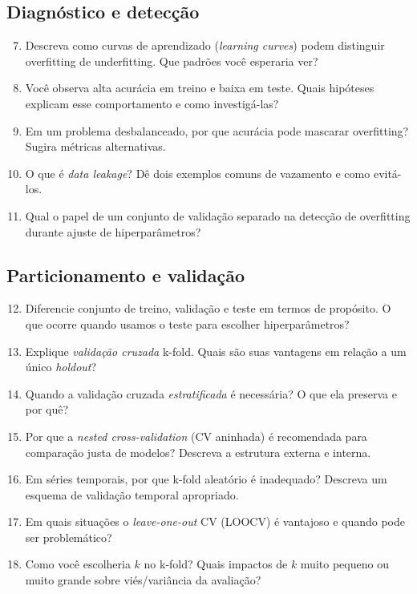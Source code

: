 \documentclass{article}
\begin{document}
\subsection{Diagnóstico e detecção}
\begin{enumerate}
  \setcounter{enumi}{6}
  \item Descreva como curvas de aprendizado (\textit{learning curves}) podem distinguir overfitting de underfitting. Que padrões você esperaria ver?
  \item Você observa alta acurácia em treino e baixa em teste. Quais hipóteses explicam esse comportamento e como investigá-las?
  \item Em um problema desbalanceado, por que acurácia pode mascarar overfitting? Sugira métricas alternativas.
  \item O que é \textit{data leakage}? Dê dois exemplos comuns de vazamento e como evitá-los.
  \item Qual o papel de um conjunto de validação separado na detecção de overfitting durante ajuste de hiperparâmetros?
\end{enumerate}

\subsection{Particionamento e validação}
\begin{enumerate}
  \setcounter{enumi}{11}
  \item Diferencie conjunto de treino, validação e teste em termos de propósito. O que ocorre quando usamos o teste para escolher hiperparâmetros?
  \item Explique \textit{validação cruzada} k-fold. Quais são suas vantagens em relação a um único \textit{holdout}?
  \item Quando a validação cruzada \textit{estratificada} é necessária? O que ela preserva e por quê?
  \item Por que a \textit{nested cross-validation} (CV aninhada) é recomendada para comparação justa de modelos? Descreva a estrutura externa e interna.
  \item Em séries temporais, por que k-fold aleatório é inadequado? Descreva um esquema de validação temporal apropriado.
  \item Em quais situações o \textit{leave-one-out} CV (LOOCV) é vantajoso e quando pode ser problemático?
  \item Como você escolheria $k$ no k-fold? Quais impactos de $k$ muito pequeno ou muito grande sobre viés/variância da avaliação?
\end{enumerate}
\end{document}
